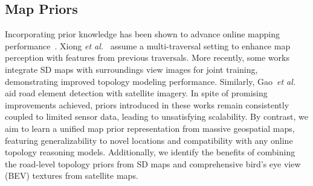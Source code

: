 
\subsection{Map Priors}
Incorporating prior knowledge has been shown to advance online mapping performance~\cite{xiong2023neuralmapprior, luo2024smerf, Gao2024ICRA, zhang2024enhancingonlineroadnetwork, Jiang2024pmapnet, Yuan2024presight}. Xiong \textit{et al.}~\cite{xiong2023neuralmapprior} assume a multi-traversal setting to enhance map perception with features from previous traversals. More recently, some works~\cite{luo2024smerf, zhang2024enhancingonlineroadnetwork} integrate SD maps with surroundings view images for joint training, demonstrating improved topology modeling performance. Similarly, Gao~\textit{et al.}~\cite{Gao2024ICRA} aid road element detection with satellite imagery. In spite of promising improvements achieved, priors introduced in these works remain consistently coupled to limited sensor data, leading to unsatisfying scalability.
By contrast, we aim to learn a unified map prior representation from massive geospatial maps, featuring generalizability to novel locations and compatibility with any online topology reasoning models.
Additionally, we identify the benefits of combining the road-level topology priors from SD maps and comprehensive bird's eye view (BEV) textures from satellite maps.



